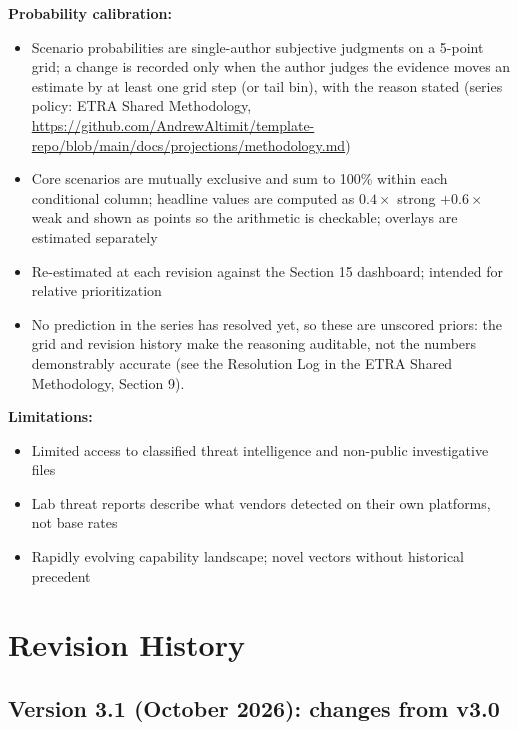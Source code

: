 \documentclass[11pt,letterpaper]{article}
\makeatletter
\newcommand{\etraneed}[1]{\par\if@nobreak\else\penalty\z@\ifdim\pagegoal<\maxdimen\ifdim\dimexpr\pagegoal-\pagetotal\relax<\dimexpr#1\relax\newpage\fi\fi\fi}
\makeatother
\begin{document}
\textbf{Probability calibration:}
\begin{itemize}[nosep]
  \item Scenario probabilities are single-author subjective judgments on a 5-point grid; a change is recorded only when the author judges the evidence moves an estimate by at least one grid step (or tail bin), with the reason stated (series policy: ETRA Shared Methodology, \url{https://github.com/AndrewAltimit/template-repo/blob/main/docs/projections/methodology.md})
  \item Core scenarios are mutually exclusive and sum to 100\% within each conditional column; headline values are computed as $0.4 \times$ strong $+ 0.6 \times$ weak and shown as points so the arithmetic is checkable; overlays are estimated separately
  \item Re-estimated at each revision against the Section 15 dashboard; intended for relative prioritization
  \item No prediction in the series has resolved yet, so these are unscored priors: the grid and revision history make the reasoning auditable, not the numbers demonstrably accurate (see the Resolution Log in the ETRA Shared Methodology, Section 9).
\end{itemize}

\etraneed{5\baselineskip}
\textbf{Limitations:}
\begin{itemize}[nosep]
  \item Limited access to classified threat intelligence and non-public investigative files
  \item Lab threat reports describe what vendors detected on their own platforms, not base rates
  \item Rapidly evolving capability landscape; novel vectors without historical precedent
\end{itemize}

\section{Revision History}
\label{app:revhistory}

\subsection*{Version 3.1 (October 2026): changes from v3.0}
\end{document}
